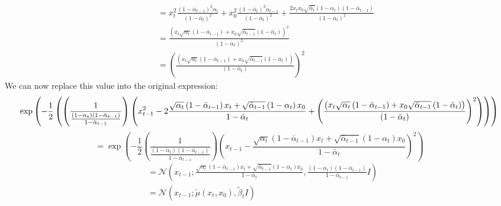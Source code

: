 \documentclass{article}
\begin{document}
\begin{align}
\begin{split}
  \end{split} \\
   &= x_t^2 \frac{ \left( 1 - \bar{\alpha}_{t-1} \right)^2 \alpha_t }{\left(1 - \bar{\alpha}_t\right)^2} + x_0^2 \frac{\left( 1 - \bar{\alpha}_{t} \right)^2 \bar{\alpha}_{t-1}}{\left(1 - \bar{\alpha}_t\right)^2} + \frac{2 x_t x_0 \sqrt{\bar{\alpha}_t}\left(1 - \alpha_t\right)\left(1 - \bar{\alpha}_{t-1}\right)}{\left(1 - \bar{\alpha}_{t}\right)^2} \\
   &= \frac{\left( x_t \sqrt{\alpha_t} \left( 1 - \bar{\alpha}_{t-1} \right) + x_0 \sqrt{\bar{\alpha}_{t-1}} \left( 1 - \bar{\alpha}_t \right) \right)^2}{\left(1 - \bar{\alpha}_{t}\right)^2} \\
   &= \left(\frac{\left( x_t \sqrt{\alpha_t} \left( 1 - \bar{\alpha}_{t-1} \right) + x_0 \sqrt{\bar{\alpha}_{t-1}} \left( 1 - \bar{\alpha}_t \right) \right)}{\left(1 - \bar{\alpha}_{t}\right)} \right)^2
\end{align}
We can now replace this value into the original expression:
\begin{equation}
  \exp \left(- \frac{1}{2} \left( \left(\frac{1}{\frac{\left(1 - \alpha_t\right)\left(1 - \bar{\alpha}_{t-1}\right)}{1 - \bar{\alpha}_{t-1}}}\right) \left(x_{t-1}^2 - 2 \frac{\sqrt{\alpha_t} \left(1 - \bar{\alpha}_{t-1}\right) x_t \\+ \sqrt{\bar{\alpha}_{t-1}}\left(1 - \alpha_t\right) x_0}{1 - \bar{\alpha}_t} + \left(\frac{\left( x_t \sqrt{\alpha_t} \left( 1 - \bar{\alpha}_{t-1} \right) + x_0 \sqrt{\bar{\alpha}_{t-1}} \left( 1 - \bar{\alpha}_t \right) \right)}{\left(1 - \bar{\alpha}_{t}\right)} \right)^2 \right) \right) \right)
\end{equation}
\begin{equation}
  = \exp \left(- \frac{1}{2} \left(\frac{1}{\frac{\left(1 - \alpha_t\right)\left(1 - \bar{\alpha}_{t-1}\right)}{1 - \bar{\alpha}_{t-1}}}\right) \left( x_{t-1} - \frac{\sqrt{\alpha_t}(1 - \bar{\alpha}_{t-1}) x_t + \sqrt{\bar{\alpha}_{t-1}}(1 - \alpha_t) x_0}{1 - \bar{\alpha}_t} \right)^2  \right)
\end{equation}
\begin{align}
  &= \mathcal{N} \left(x_{t-1}; \frac{\sqrt{\alpha_t}(1 - \bar{\alpha}_{t-1}) x_t + \sqrt{\bar{\alpha}_{t-1}}(1 - \alpha_t) x_0}{1 - \bar{\alpha}_t} , \frac{\left(1 - \alpha_t\right)\left(1 - \bar{\alpha}_{t-1}\right)}{1 - \bar{\alpha}_{t-1}} I \right) \\
  &= \mathcal{N} \left(x_{t-1}; \tilde{\mu}(x_t, x_0), \tilde{\beta}_t I \right)
\end{align}
\end{document}
